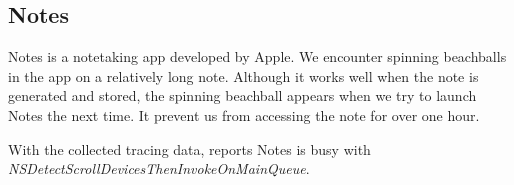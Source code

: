 \subsection{Notes}

Notes is a notetaking app developed by Apple. We encounter spinning beachballs
in the app on a relatively long note. Although it works well when the note is
generated and stored, the spinning beachball appears when we try to launch Notes
the next time. It prevent us from accessing the note for over one hour.

With the collected tracing data, \xxx reports Notes is busy with
\textit{NSDetectScrollDevicesThenInvokeOnMainQueue}.

